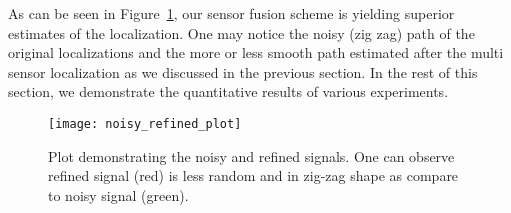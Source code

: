 As can be seen in Figure~\ref{fig:noisy_refined_plot}, our sensor fusion scheme is
yielding superior estimates of the localization. One may notice the noisy (zig zag)
path of the original localizations and the more or less smooth path estimated 
after the multi sensor localization as we discussed in the previous section.
In the rest of this section, we demonstrate the quantitative results of various
experiments.
\begin{figure}[t]
\centering
\texttt{[image: noisy\_refined\_plot]}
\caption{Plot demonstrating the noisy and refined \gps signals. One can observe
refined \gps signal (red) is less random and in zig-zag shape as 
compare to noisy \gps signal (green).
}
\label{fig:noisy_refined_plot}
\end{figure}

